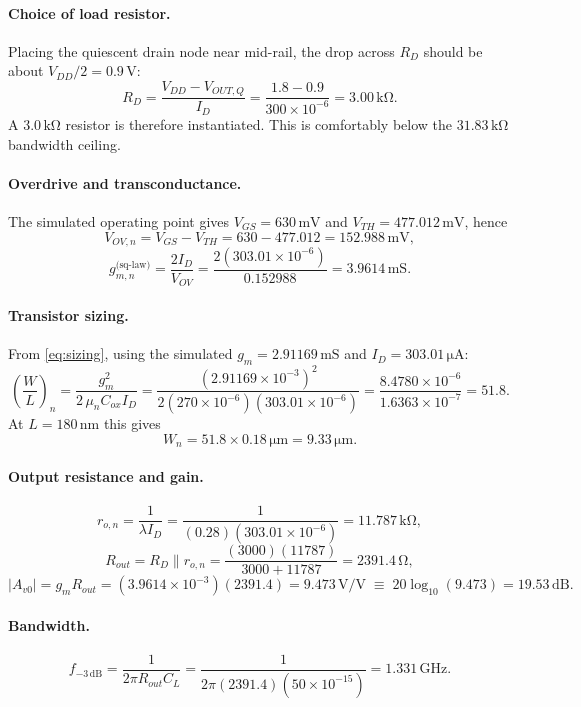 \documentclass[12pt,a4paper]{article}
\newcommand{\U}[1]{\,\mathrm{#1}}
\newcommand{\WL}{\left(\dfrac{W}{L}\right)}
\begin{document}
\paragraph{Choice of load resistor.}
Placing the quiescent drain node near mid-rail, the drop across $R_D$ should be
about $V_{DD}/2 = 0.9\U{V}$:
\[
R_D = \frac{V_{DD}-V_{OUT,Q}}{I_D} = \frac{1.8-0.9}{300\times10^{-6}}
    = 3.00\U{k\Omega}.
\]
A $3.0\U{k\Omega}$ resistor is therefore instantiated. This is comfortably
below the $31.83\U{k\Omega}$ bandwidth ceiling.

\paragraph{Overdrive and transconductance.}
The simulated operating point gives $V_{GS}=630\U{mV}$ and
$V_{TH}=477.012\U{mV}$, hence
\[
V_{OV,n} = V_{GS}-V_{TH} = 630 - 477.012 = 152.988\U{mV},
\]
\[
g_{m,n}^{\text{(sq-law)}} = \frac{2I_D}{V_{OV}}
 = \frac{2(303.01\times10^{-6})}{0.152988} = 3.9614\U{mS}.
\]

\paragraph{Transistor sizing.}
From \eqref{eq:sizing}, using the simulated $g_m = 2.91169\U{mS}$ and
$I_D=303.01\U{\mu A}$:
\[
\WL_n = \frac{g_m^{2}}{2\,\mu_n C_{ox} I_D}
      = \frac{(2.91169\times10^{-3})^{2}}
             {2(270\times10^{-6})(303.01\times10^{-6})}
      = \frac{8.4780\times10^{-6}}{1.6363\times10^{-7}} = 51.8 .
\]
At $L = 180\U{nm}$ this gives
\[
W_n = 51.8 \times 0.18\U{\mu m} = 9.33\U{\mu m}.
\]

\paragraph{Output resistance and gain.}
\[
r_{o,n} = \frac{1}{\lambda I_D} = \frac{1}{(0.28)(303.01\times10^{-6})}
        = 11.787\U{k\Omega},
\]
\[
R_{out} = R_D \parallel r_{o,n}
        = \frac{(3000)(11787)}{3000+11787} = 2391.4\U{\Omega},
\]
\[
|A_{v0}| = g_m R_{out} = (3.9614\times10^{-3})(2391.4) = 9.473\U{V/V}
         \;\equiv\; 20\log_{10}(9.473) = 19.53\U{dB}.
\]

\paragraph{Bandwidth.}
\[
f_{-3\U{dB}} = \frac{1}{2\pi R_{out}C_L}
             = \frac{1}{2\pi(2391.4)(50\times10^{-15})} = 1.331\U{GHz}.
\]
\end{document}
